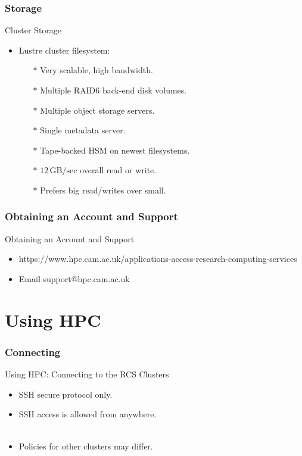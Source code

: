 \section{Storage}
\begin{frame}{Cluster Storage}
  \begin{itemize}
\item{Lustre cluster filesystem:}
  \begin{itemize}
\item[$\ast$]{Very scalable, high bandwidth.}
\item[$\ast$]{Multiple RAID6 back-end disk volumes.}
\item[$\ast$]{Multiple object storage servers.}
\item[$\ast$]{Single metadata server.}
\item[$\ast$]{Tape-backed HSM on newest filesystems.}
\item[$\ast$]{\alert{$12\,\text{GB/sec}$ overall read or write.}}
\item[$\ast$]{\alert{Prefers big read/writes over small.}}
\end{itemize}
\end{itemize}
\end{frame}

\section{Obtaining an Account and Support}
\begin{frame}{Obtaining an Account and Support}
\begin{itemize}
\item{\alert{https://www.hpc.cam.ac.uk/applications-access-research-computing-services}}
\item{Email \alert{support@hpc.cam.ac.uk}}
\end{itemize}
\end{frame}

\part{Using HPC}
\frame{\partpage}

\section{Connecting}
\begin{frame}{Using HPC: Connecting to the RCS Clusters}
\begin{itemize}
\item SSH secure protocol only.\hfill\\
\item<3-> SSH access is allowed from anywhere.\hfill\\
\hfill\\
\item<5->{Policies for other clusters may differ.}
\end{itemize}
\end{frame}

